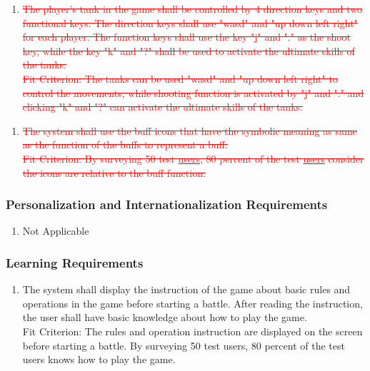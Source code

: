 \documentclass[12pt, titlepage]{article}
\begin{document}
\begin{enumerate}
	\item \textcolor{red}{\sout{The player's tank in the game shall be controlled by 4 direction keys and two functional keys. The direction keys shall use "wasd" and "up down left right" for each player. The function keys shall use the key "j" and "." as the shoot key, while the key "k" and "?" shall be used to activate the ultimate skills of the tanks.}} 
	\\
	
	\textcolor{red}{\sout{Fit Criterion: The tanks can be used "wasd" and "up down left right" to control the movements, while shooting function is activated by "j" and "." and clicking "k" and "?" can activate the ultimate skills of the tanks.}}
	
\end{enumerate}

\begin{enumerate}
	\item \textcolor{red}{\sout{ The system shall use the buff icons that have the symbolic meaning as same as the function of the buffs to represent a buff.}}
	\\
	
	\textcolor{red}{\sout{Fit Criterion: By surveying 50 test \underline{users}, 80 percent of the test \underline{users} consider the icons are relative to the buff function.}}
\end{enumerate}

\subsubsection{Personalization and Internationalization Requirements}
\label{ssub:personalization_and_internationalization_requirements}
\begin{enumerate}
	\item Not Applicable
\end{enumerate}

\subsubsection{Learning Requirements}
\label{ssub:learning_requirements}
\begin{enumerate}
	\item The system shall display the instruction of the game about basic rules and operations in the game before starting a battle. After reading the instruction, the user shall have basic knowledge about how to play the game.
	\\
	
	Fit Criterion: The rules and operation instruction are displayed on the screen before starting a battle. By surveying 50 test users, 80 percent of the test users knows how to play the game.
\end{enumerate}
\end{document}
